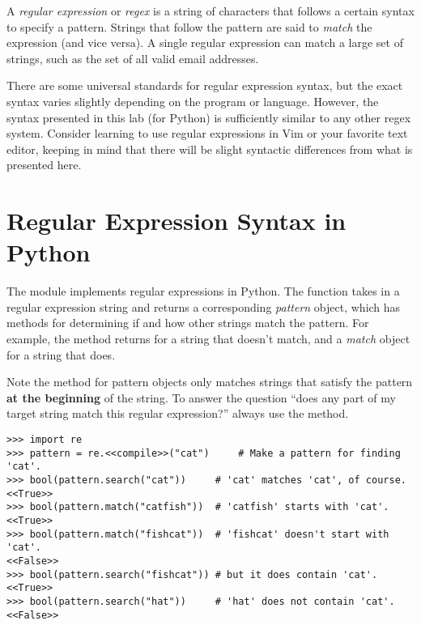 

A \emph{regular expression} or \emph{regex} is a string of characters that follows a certain syntax to specify a pattern.
Strings that follow the pattern are said to \emph{match} the expression (and vice versa).
A single regular expression can match a large set of strings, such as the set of all valid email addresses.

\begin{warn}
There are some universal standards for regular expression syntax, but the exact syntax varies slightly depending on the program or language.
However, the syntax presented in this lab (for Python) is sufficiently similar to any other regex system.
Consider learning to use regular expressions in Vim or your favorite text editor, keeping in mind that there will be slight syntactic differences from what is presented here.
\end{warn}

\section*{Regular Expression Syntax in Python} %

The  module implements regular expressions in Python.
The function  takes in a regular expression string and returns a corresponding \emph{pattern} object, which has methods for determining if and how other strings match the pattern.
For example, the  method returns  for a string that doesn't match, and a \emph{match} object for a string that does.

Note the  method for pattern objects only matches strings that satisfy the pattern \textbf{at the beginning} of the string.
To answer the question ``does any part of my target string match this regular expression?'' always use the  method.

\begin{lstlisting}
>>> import re
>>> pattern = re.<<compile>>("cat")     # Make a pattern for finding 'cat'.
>>> bool(pattern.search("cat"))     # 'cat' matches 'cat', of course.
<<True>>
>>> bool(pattern.match("catfish"))  # 'catfish' starts with 'cat'.
<<True>>
>>> bool(pattern.match("fishcat"))  # 'fishcat' doesn't start with 'cat'.
<<False>>
>>> bool(pattern.search("fishcat")) # but it does contain 'cat'.
<<True>>
>>> bool(pattern.search("hat"))     # 'hat' does not contain 'cat'.
<<False>>
\end{lstlisting}

